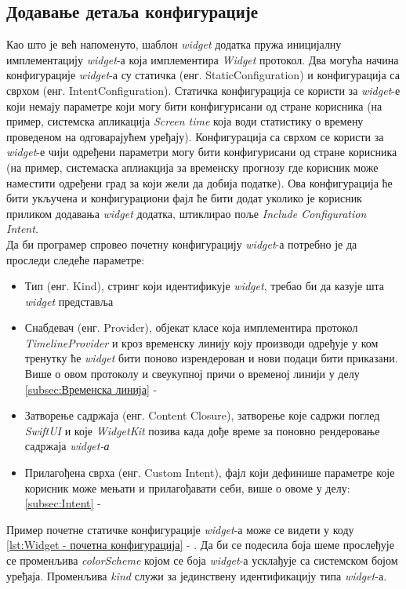 \documentclass[12pt,oneside]{memoir}
\begin{document}
\subsection{Додавање детаља конфигурације}
\indent Као што је већ напоменуто, шаблон \textit{widget} додатка пружа иницијалну имплементацију \textit{widget}-а која имплементира \textit{Widget} протокол. Два могућа начина конфигурације \textit{widget}-а су статичка (енг. StaticConfiguration) и конфигурација са сврхом (енг. IntentConfiguration).
\indent Статичка конфигурација се користи за \textit{widget}-е који немају параметре који могу бити конфигурисани од стране корисника (на пример, системска апликација \textit{Screen time} која води статистику о времену проведеном на одговарајућем уређају).
\indent Конфигурација са сврхом се користи за \textit{widget}-е чији одређени параметри могу бити конфигурисани од стране корисника (на пример, системаска аплиакција за временску прогнозу где корисник може наместити одређени град за који жели да добија податке). Ова конфигурација ће бити укључена и конфигурациони фајл ће бити додат уколико је корисник приликом додавања \textit{widget} додатка, штиклирао поље \textit{Include Configuration Intent}.
\\
\indent Да би програмер спровео почетну конфигурацију \textit{widget}-а потребно је да проследи следеће параметре:
\begin{itemize}
    \item Тип (енг. Kind), стринг који идентификује \textit{widget}, требао би да казује шта \textit{widget} представља
    \item Снабдевач (енг. Provider), објекат класе која имплементира протокол \textit{TimelineProvider} и кроз временску линију коју производи одређује у ком тренутку ће \textit{widget} бити поново изрендерован и нови подаци бити приказани. Више о овом протоколу и свеукупној причи о временој линији у делу \ref{subsec:Временска линија} - 
    \item Затворење садржаја (енг. Content Closure), затворење које садржи поглед \textit{SwiftUI} и које \textit{WidgetKit} позива када дође време за поновно рендеровање садржаја \textit{widget-а}
    \item Прилагођена сврха (енг. Custom Intent), фајл који дефинише параметре које корисник може мењати и прилагођавати себи, више о овоме у делу: \ref{subsec:Intent} - 
\end{itemize}
Пример почетне статичке конфигурације \textit{widget}-а може се видети у коду \ref{lst:Widget - почетна конфигурација} - . Да би се подесила боја шеме прослеђује се променљива \textit{colorScheme} којом се боја \textit{widget}-а усклађује са системском бојом уређаја. Променљива \textit{kind} служи за јединствену идентификацију типа \textit{widget}-а. 
\end{document}
